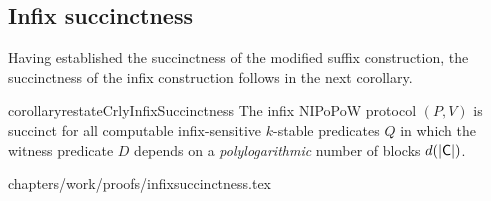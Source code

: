 
\subsection{Infix succinctness}
Having established the succinctness of the modified suffix construction, the
succinctness of the infix construction follows in the next corollary.

\begin{restatable}{corollary}{restateCrlyInfixSuccinctness}
\label{thm.infix-succinctness}
The infix NIPoPoW protocol $(P, V)$ is succinct for all computable
infix-sensitive $k$-stable predicates $Q$ in which the witness predicate $D$
depends on a \emph{polylogarithmic} number of blocks $d(|\mathsf{C}|)$.
\end{restatable}
{chapters/work/proofs/infixsuccinctness.tex}
